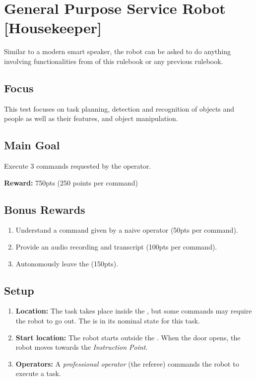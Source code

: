 \section{General Purpose Service Robot [Housekeeper]}
\label{test:gpsr}
Similar to a modern smart speaker, the robot can be asked to do anything involving functionalities from \SONE{} of this rulebook or any previous rulebook.

\subsection*{Focus}
This test focuses on task planning, detection and recognition of objects and people as well as their features, and object manipulation.

\subsection*{Main Goal}
Execute 3 commands requested by the operator.

\noindent\textbf{Reward:} 750pts (250 points per command)\\

\subsection*{Bonus Rewards}
\begin{enumerate}[nosep]
	\item Understand a command given by a naive operator (50pts per command).
	\item Provide an audio recording and transcript (100pts per command).
	\item Autonomously leave the \Arena{} (150pts).
\end{enumerate}

%
%
\subsection*{Setup}
\begin{enumerate}[nosep]
	\item \textbf{Location:} The task takes place inside the \Arena{}, but some commands may require the robot to go out. The \Arena{} is in its nominal state for this task.
	\item \textbf{Start location:} The robot starts outside the \Arena{}. When the door opens, the robot moves towards the \textit{Instruction Point}.
	\item \textbf{Operators:} A \emph{professional operator} (the referee) commands the robot to execute a task.
\end{enumerate}



